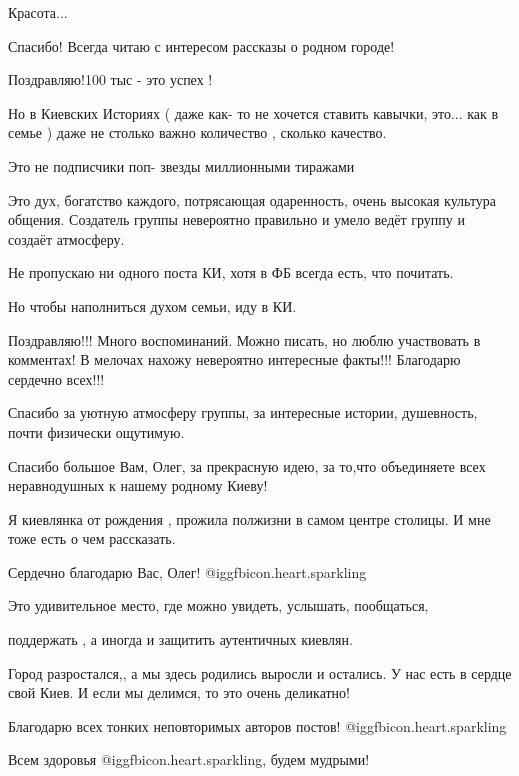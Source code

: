 \begin{itemize}
\begin{itemize}
\end{itemize} %

Красота...

Спасибо! Всегда читаю с интересом рассказы о родном городе!


Поздравляю!100 тыс - это успех !

Но в Киевских Историях ( даже как- то не хочется ставить кавычки, это... как в
семье ) даже не столько важно количество , сколько качество.

Это не подписчики поп- звезды миллионными тиражами

Это дух, богатство каждого, потрясающая одаренность, очень высокая культура
общения. Создатель группы невероятно правильно и умело ведёт группу и создаёт
атмосферу.

Не пропускаю ни одного поста КИ, хотя в ФБ всегда есть, что почитать.

Но чтобы наполниться духом семьи, иду в КИ.


Поздравляю!!! Много воспоминаний. Можно писать, но люблю участвовать в
комментах! В мелочах нахожу невероятно интересные факты!!! Благодарю сердечно
всех!!!


Спасибо за уютную атмосферу группы, за интересные истории, душевность, почти физически ощутимую.


Спасибо большое Вам, Олег, за прекрасную идею, за то,что объединяете всех неравнодушных к нашему родному Киеву!

Я киевлянка от рождения , прожила полжизни в самом центре столицы. И мне тоже есть о чем рассказать.


Сердечно благодарю Вас, Олег!  @igg{fbicon.heart.sparkling} 

Это удивительное место, где можно увидеть, услышать, пообщаться,

поддержать , а иногда и защитить аутентичных киевлян.

Город разростался,, а мы здесь родились выросли и остались. У нас есть в сердце свой Киев. И если мы делимся, то это очень деликатно!

Благодарю всех тонких неповторимых авторов постов! @igg{fbicon.heart.sparkling} 

Всем здоровья @igg{fbicon.heart.sparkling}, будем мудрыми!

\end{itemize} %

